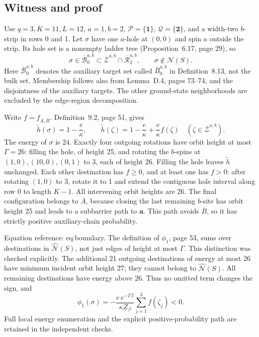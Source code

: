 \documentclass[10pt]{article}
\begin{document}
\subsection*{Witness and proof}
Use \(q=3,K=11,L=12\), \(a=1,b=2\), \(\mathcal P=\{\mathbf1\}\), \(\mathcal Q=\{\mathbf2\}\), and a width-two \(b\)-strip in rows 0 and 1. Let \(\sigma\) have one \(a\)-hole at \((0,0)\) and spin \(a\) outside the strip. Its hole set is a nonempty ladder tree (Proposition 6.17, page 29), so \[\sigma\in\overline{\mathcal B}^{a,b}_0
 \subset\overline{\mathcal Z}^{a,b}\cap\overline{\mathcal R}^{a,b}_2,
 \qquad \sigma\notin\mathcal N(S).\] Here \(\overline{\mathcal B}^{a,b}_0\) denotes the auxiliary target set called \(\overline B^{a,b}_0\) in Definition 8.13, not the bulk set. Membership follows also from Lemma D.4, pages 73–74, and the disjointness of the auxiliary targets. The other ground-state neighborhoods are excluded by the edge-region decomposition.\par
Write \(f=f_{\overline A,\overline B}\). Definition 9.2, page 51, gives \[\widetilde h(\sigma)=1-\frac e\kappa,\qquad
 \widetilde h(\zeta)=1-\frac e\kappa+\frac e\kappa f(\zeta)
 \quad(\zeta\in\overline{\mathcal Z}^{a,b}).\] The energy of \(\sigma\) is \(24\). Exactly four outgoing rotations have orbit height at most \(\Gamma=26\): filling the hole, of height 25, and rotating the \(b\)-spins at \((1,0),(10,0),(0,1)\) to 3, each of height 26. Filling the hole leaves \(\widetilde h\) unchanged. Each other destination has \(f\geq0\), and at least one has \(f>0\): after rotating \((1,0)\) to 3, rotate it to 1 and extend the contiguous hole interval along row 0 to length \(K-1\). All intervening orbit heights are 26. The final configuration belongs to \(\overline A\), because closing the last remaining \(b\)-site has orbit height 25 and leads to a subbarrier path to \(\mathbf a\). This path avoids \(\overline B\), so it has strictly positive auxiliary-chain probability.\par
Equation reference: eq:boundary. The definition of \(\phi_1\), page 53, sums over destinations in \(\widehat{\mathcal N}(S)\), not just edges of height at most \(\Gamma\). This distinction was checked explicitly. The additional 21 outgoing destinations of energy at most 26 have minimum incident orbit height 27; they cannot belong to \(\widehat{\mathcal N}(S)\). All remaining destinations have energy above 26. Thus no omitted term changes the sign, and \[
 \phi_1(\sigma)
 =-\frac{e\,e^{-\Gamma\beta}}{\kappa Z_\beta}
       \sum_{j=1}^{3}f(\zeta_j)<0.\] Full local energy enumeration and the explicit positive-probability path are retained in the independent checks.\par
\end{document}
